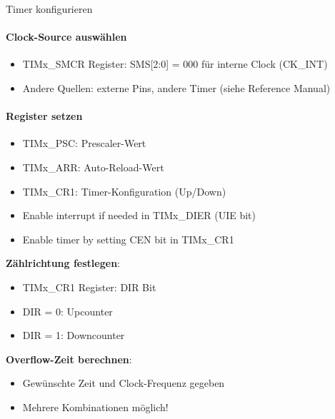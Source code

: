 \begin{KR}{Timer konfigurieren}
    \paragraph{Clock-Source auswählen}
    \begin{itemize}
        \item TIMx\_SMCR Register: SMS[2:0] = 000 für interne Clock (CK\_INT)
        \item Andere Quellen: externe Pins, andere Timer (siehe Reference Manual)
    \end{itemize}

    \paragraph{Register setzen}
    \begin{itemize}
        \item TIMx\_PSC: Prescaler-Wert
        \item TIMx\_ARR: Auto-Reload-Wert
        \item TIMx\_CR1: Timer-Konfiguration (Up/Down)
        \item Enable interrupt if needed in TIMx\_DIER (UIE bit)
        \item Enable timer by setting CEN bit in TIMx\_CR1
    \end{itemize}
    
    \textbf{Zählrichtung festlegen}:
    \begin{itemize}
        \item TIMx\_CR1 Register: DIR Bit
        \item DIR = 0: Upcounter
        \item DIR = 1: Downcounter
    \end{itemize}
    
    \textbf{Overflow-Zeit berechnen}:
    \begin{itemize}
        \item Gewünschte Zeit und Clock-Frequenz gegeben
        \item Mehrere Kombinationen möglich!
    \end{itemize}
\end{KR}



